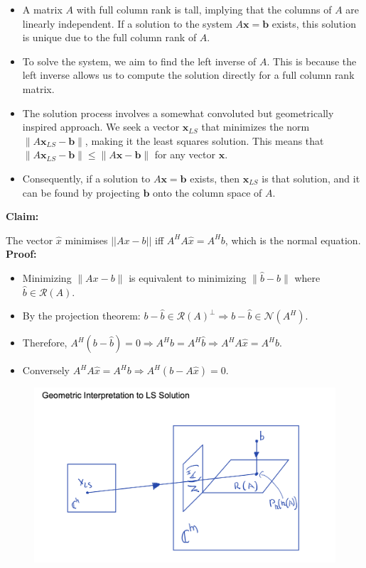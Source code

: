 \begin{itemize}
    \item A matrix \( A \) with full column rank is tall, implying that the columns of \( A \) are linearly independent. If a solution to the system \( A\mathbf{x} = \mathbf{b} \) exists, this solution is unique due to the full column rank of \( A \).
    
    \item To solve the system, we aim to find the left inverse of \( A \). This is because the left inverse allows us to compute the solution directly for a full column rank matrix.
    
    \item The solution process involves a somewhat convoluted but geometrically inspired approach. We seek a vector \( \mathbf{x}_{LS} \) that minimizes the norm \( \|A\mathbf{x}_{LS} - \mathbf{b}\| \), making it the least squares solution. This means that \( \|A\mathbf{x}_{LS} - \mathbf{b}\| \leq \|A\mathbf{x} - \mathbf{b}\| \) for any vector \( \mathbf{x} \).
    
    \item Consequently, if a solution to \( A\mathbf{x} = \mathbf{b} \) exists, then \( \mathbf{x}_{LS} \) is that solution, and it can be found by projecting \( \mathbf{b} \) onto the column space of \( A \).
\end{itemize}


\textbf{Claim:}

The vector $\widehat{x}$ minimises $||Ax-b||$ iff $A^H A\widehat{x} = A^Hb$, which is the normal equation.\\


\textbf{Proof:}
\begin{itemize}
    \item Minimizing $\|Ax - b\|$ is equivalent to minimizing $\|\hat{b} - b\|$ where $\hat{b} \in \mathcal{R}(A)$.
    \item By the projection theorem: $b - \hat{b} \in \mathcal{R}(A)^\perp \Rightarrow b - \hat{b} \in \mathcal{N}(A^H)$.
    \item Therefore, $A^H(b - \hat{b}) = 0 \Rightarrow A^Hb = A^H\hat{b} \Rightarrow A^HA\hat{x} = A^Hb$.
    \item Conversely $A^HA\hat{x} = A^Hb \Rightarrow A^H(b - A\hat{x}) = 0$.
\end{itemize}
\begin{figure}
    \centering
    \includegraphics[width=0.75\linewidth]{img/geom_ls.png}
    
    
\end{figure}

